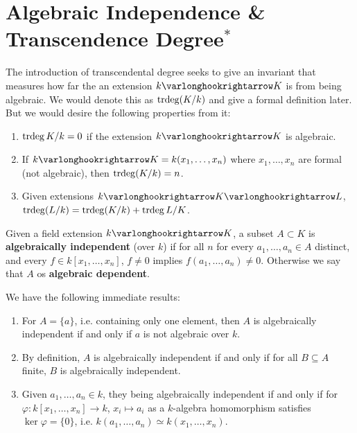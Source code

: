 \section{Algebraic Independence \& Transcendence Degree$^{\ast}$}

\textstart
The introduction of transcendental degree seeks to give an invariant that measures how far the an extension $k \ext K$ is from being algebraic. We would denote this as $\operatorname{trdeg}(K/k)$ and give a formal definition later. But we would desire the following properties from it:
\begin{enumerate}[label=\arabic*)]
    \item $\operatorname{trdeg}{K/k} = 0$ if the extension $k \ext K$ is algebraic. 
    \item If $k \ext K = k(x_1, \dots, x_n)$ where $x_1, \dots, x_n$ are formal (not algebraic), then $\operatorname{trdeg}(K/k) = n$.
    \item Given extensions $k \ext K \ext L$, $\operatorname{trdeg}(L/k) = \operatorname{trdeg}(K/k) + \operatorname{trdeg}{L/K}$.
\end{enumerate}

\begin{definition}
    Given a field extension $k \ext K$, a subset $A \subset K$ is \textbf{algebraically independent} (over $k$) if for all $n$ for every $a_1, \dots, a_n \in A$ distinct, and every $f \in k[x_1, \dots, x_n]$, $f \neq 0$ implies $f(a_1, \dots, a_n) \neq 0$. Otherwise we say that $A$ os \textbf{algebraic dependent}.
\end{definition}

\begin{remark}
    We have the following immediate results:
    \begin{enumerate}[label=\arabic*)]
        \item For $A = \{a\}$, i.e. containing only one element, then $A$ is algebraically independent if and only if $a$ is not algebraic over $k$. 
        \item By definition, $A$ is algebraically independent if and only if for all $B \subseteq A$ finite, $B$ is algebraically independent. 
        \item Given $a_1, \dots, a_n \in k$, they being algebraically independent if and only if for $\varphi: k[x_1, \dots, x_n] \to k$, $x_i \mapsto a_i$ as a $k$-algebra homomorphism satisfies $\ker \varphi = \{0\}$, i.e. $k(a_1, \dots, a_n) \simeq k(x_1, \dots, x_n)$.
    \end{enumerate}
\end{remark}


